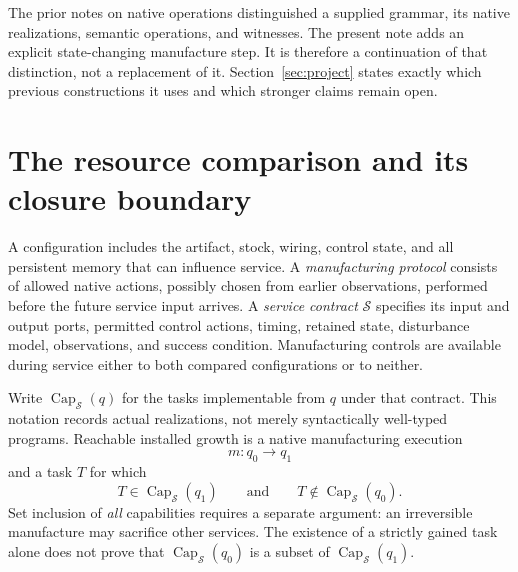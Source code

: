 \documentclass[11pt]{article}
\theoremstyle{definition}
\theoremstyle{remark}
\begin{document}
The prior notes on native operations distinguished a supplied grammar,
its native realizations, semantic operations, and witnesses. The present
note adds an explicit state-changing manufacture step. It is therefore a
continuation of that distinction, not a replacement of it. Section~\ref{sec:project}
states exactly which previous constructions it uses and which stronger
claims remain open.

\section{The resource comparison and its closure boundary}\label{sec:boundary}
A configuration includes the artifact, stock, wiring, control state, and
all persistent memory that can influence service. A \emph{manufacturing
protocol} consists of allowed native actions, possibly chosen from earlier
observations, performed before the future service input arrives. A
\emph{service contract} $\mathcal S$ specifies its input and output ports,
permitted control actions, timing, retained state, disturbance model,
observations, and success condition. Manufacturing controls are available
during service either to both compared configurations or to neither.

Write $\operatorname{Cap}_{\mathcal S}(q)$ for the tasks implementable from
$q$ under that contract. This notation records actual realizations, not
merely syntactically well-typed programs. Reachable installed growth is a
native manufacturing execution
\[
                 m:q_0\longrightarrow q_1
\]
and a task $T$ for which
\[
 T\in\operatorname{Cap}_{\mathcal S}(q_1)
 \qquad\text{and}\qquad
 T\notin\operatorname{Cap}_{\mathcal S}(q_0).
\]
Set inclusion of \emph{all} capabilities requires a separate argument:
an irreversible manufacture may sacrifice other services. The existence
of a strictly gained task alone does not prove that
$\operatorname{Cap}_{\mathcal S}(q_0)$ is a subset of
$\operatorname{Cap}_{\mathcal S}(q_1)$.
\end{document}
